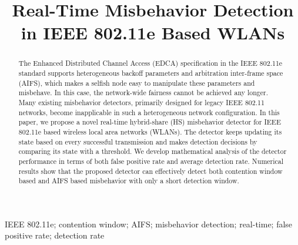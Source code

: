\documentclass[conference]{IEEEtran}
\begin{document}
\title{Real-Time Misbehavior Detection in IEEE 802.11e Based WLANs}

\author{}

\maketitle


\begin{abstract}
The Enhanced Distributed Channel Access (EDCA) specification in the IEEE 802.11e standard supports heterogeneous backoff parameters and arbitration inter-frame space (AIFS), which makes a selfish node easy to manipulate these parameters and misbehave. In this case, the network-wide fairness cannot be achieved any longer. Many existing misbehavior detectors, primarily designed for legacy IEEE 802.11 networks, become inapplicable in such a heterogeneous network configuration. In this paper, we propose a novel real-time hybrid-share (HS) misbehavior detector for IEEE 802.11e based wireless local area networks (WLANs). The detector keeps updating its state based on every successful transmission and makes detection decisions by comparing its state with a threshold. We develop mathematical analysis of the detector performance in terms of both false positive rate and average detection rate. Numerical results show that the proposed detector can effectively detect both contention window based and AIFS based misbehavior with only a short detection window.
\end{abstract}

\begin{IEEEkeywords}
IEEE 802.11e; contention window; AIFS; misbehavior detection; real-time; false positive rate; detection rate
\end{IEEEkeywords}

\IEEEpeerreviewmaketitle
\end{document}
